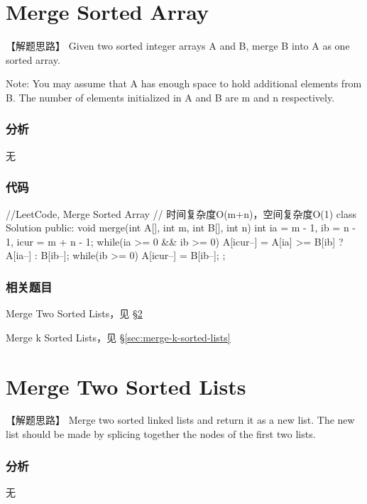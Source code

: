 \section{Merge Sorted Array} %
\label{sec:merge-sorted-array}


【解题思路】
Given two sorted integer arrays A and B, merge B into A as one sorted array.

Note:
You may assume that A has enough space to hold additional elements from B. The number of elements initialized in A and B are m and n respectively.


\subsubsection{分析}
无


\subsubsection{代码}
\begin{Code}
	//LeetCode, Merge Sorted Array
	// 时间复杂度O(m+n)，空间复杂度O(1)
	class Solution {
		public:
		void merge(int A[], int m, int B[], int n) {
			int ia = m - 1, ib = n - 1, icur = m + n - 1;
			while(ia >= 0 && ib >= 0) {
				A[icur--] = A[ia] >= B[ib] ? A[ia--] : B[ib--];
			}
			while(ib >= 0) {
				A[icur--] = B[ib--];
			}
		}
	};
\end{Code}


\subsubsection{相关题目}
\begindot
\item Merge Two Sorted Lists，见 \S \ref{sec:merge-two-sorted-lists}
\item Merge k Sorted Lists，见 \S \ref{sec:merge-k-sorted-lists}
\myenddot


\section{Merge Two Sorted Lists} %
\label{sec:merge-two-sorted-lists}


【解题思路】
Merge two sorted linked lists and return it as a new list. The new list should be made by splicing together the nodes of the first two lists.


\subsubsection{分析}
无


